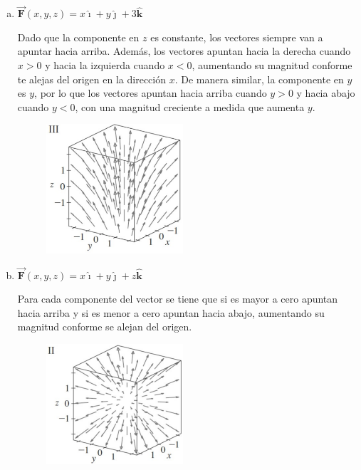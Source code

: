 \documentclass[12pt]{exam}
\newcommand{\iuni}{\pmb{\hat{\imath}}}
\newcommand{\juni}{\pmb{\hat{\jmath}}}
\newcommand{\kuni}{\pmb{\hat{k}}}
\newcommand{\vecb}[1]{\pmb{\vec{#1}}} %
\begin{document}
\begin{questions}
\begin{enumerate}[a)]
  \item $\vecb{F}(x,y,z)=x \iuni + y \juni + 3 \kuni$

    \begin{minipage}{0.5\textwidth}
      Dado que la componente en $z$ es constante, los vectores siempre van a apuntar hacia arriba. Además, los vectores apuntan hacia la derecha cuando \(x > 0\) y hacia la izquierda cuando \(x < 0\), aumentando su magnitud conforme te alejas del origen en la dirección \(x\). De manera similar, la componente en \(y\) es \(y\), por lo que los vectores apuntan hacia arriba cuando \(y > 0\) y hacia abajo cuando \(y < 0\), con una magnitud creciente a medida que aumenta \(y\). 
    \end{minipage}%
    \begin{minipage}{0.5\textwidth}
      \begin{figure}[H]
        \centering
        \centering
        \includegraphics[width=2in]{./img/ej2_III.png}
      \end{figure}
    \end{minipage}

    
  \item $\vecb{F}(x,y,z)=x \iuni + y \juni + z \kuni$

    \begin{minipage}{0.5\textwidth}
      Para cada componente del vector se tiene que si es mayor a cero apuntan hacia arriba y si es menor a cero apuntan hacia abajo, aumentando su magnitud conforme se alejan del origen.
    \end{minipage}%
    \begin{minipage}{0.5\textwidth}
      \begin{figure}[H]
        \centering
        \centering
        \includegraphics[width=2in]{./img/ej2_II.png}
      \end{figure}
    \end{minipage}
    

\end{enumerate}
\end{questions}
\end{document}
